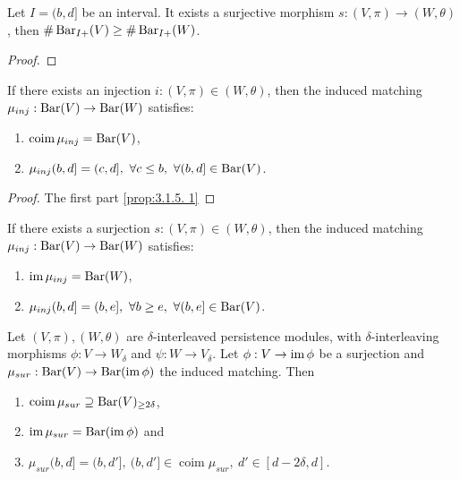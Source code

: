 \begin{lemma} %
    Let $ I = (b, d] $ be an interval. It exists a surjective morphism $s: (V, \pi) \to (W, \theta) $, then $\# \operatorname{Bar}_{I+}(V) \geq \# \operatorname{Bar}_{I+}(W) $.
\end{lemma}
\begin{proof}
    
\end{proof}

\begin{lemma} %
    If there exists an injection $i: (V, \pi) \in (W, \theta) $, then the induced matching $ \mu_{inj}: \operatorname{Bar}(V) \to \operatorname{Bar} (W) $ satisfies:
    \begin{enumerate}
        \item $\operatorname{coim} \mu_{inj} = \operatorname{Bar}(V)$, \label{prop:3.1.5. 1}
        \item $\mu_{inj}(b, d] = (c, d], \ \forall c \leq b, \ \forall (b, d] \in \operatorname{Bar}(V)$.
    \end{enumerate}
\end{lemma}
\begin{proof}
    The first part \ref{prop:3.1.5. 1}
\end{proof}

\begin{lemma}
    If there exists a surjection $s: (V, \pi) \in (W, \theta) $, then the induced matching $ \mu_{inj}: \operatorname{Bar}(V) \to \operatorname{Bar} (W) $ satisfies:
    \begin{enumerate}
        \item $\operatorname{im} \mu_{inj} = \operatorname{Bar}(W)$,
        \item $\mu_{inj}(b, d] = (b, e], \ \forall b \geq e, \ \forall (b, e] \in \operatorname{Bar}(V)$.
    \end{enumerate}
\end{lemma}

\begin{lemma}
    Let $ (V, \pi), (W, \theta) $ are $\delta$-interleaved persistence modules, with $\delta$-interleaving morphisms $ \phi: V \to W_\delta $ and $ \psi: W \to V_\delta $. Let $ \phi: V \to \operatorname{im}\phi $ be a surjection and $ \mu_{sur}: \operatorname{Bar}(V) \to \operatorname{Bar} (\operatorname{im} \phi)$ the induced matching. Then
    \begin{enumerate}
        \item $\operatorname{coim} \mu_{sur} \supseteq \operatorname{Bar} (V)_{\geq 2\delta} $,
        \item $ \operatorname{im} \mu_{sur} = \operatorname{Bar} (\operatorname{im} \phi)$ and
        \item $ \mu_{sur}(b, d] = (b, d'], \ (b, d'] \in \operatorname{coim} \mu_{sur}, \ d' \in [d-2\delta, d]$.
    \end{enumerate}
\end{lemma}

